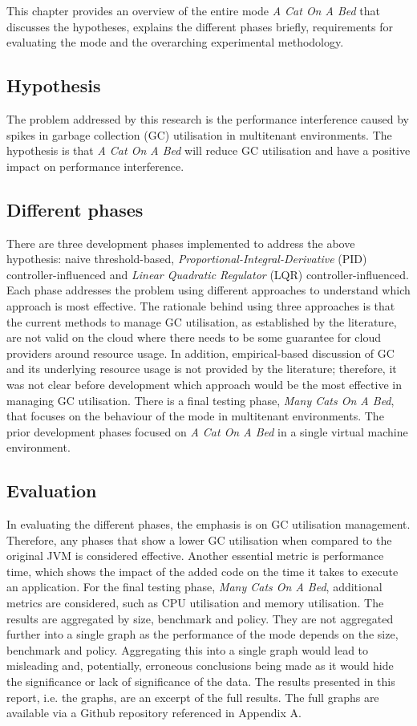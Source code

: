 This chapter provides an overview of the entire mode \emph{A Cat On A Bed} that discusses the hypotheses, explains the different
phases briefly, requirements for evaluating the mode and the overarching
experimental methodology.
\subsection{Hypothesis}
The problem addressed by this research is the performance interference
caused by spikes in garbage collection (GC) utilisation in multitenant environments. The
hypothesis is that \emph{A Cat On A Bed} will reduce GC utilisation and have a
positive impact on performance interference.
\subsection{Different phases}
There are three development phases implemented to address the above
hypothesis: naive threshold-based, \emph{Proportional-Integral-Derivative}
(PID) controller-influenced and \emph{Linear Quadratic Regulator} (LQR)
controller-influenced. Each phase addresses the problem using different
approaches to understand which approach is most effective. The rationale
behind using three approaches is that the current methods to manage GC
utilisation, as established by the literature, are not valid on the
cloud where there needs to be some guarantee for cloud providers around
resource usage. In addition, empirical-based discussion of GC and its
underlying resource usage is not provided by the literature; therefore,
it was not clear before development which approach would be the most
effective in managing GC utilisation.
\newline\newline
There is a final testing phase,\emph{ Many Cats On A Bed}, that focuses on the
behaviour of the mode in multitenant environments. The prior development
phases focused on \emph{A Cat On A Bed} in a single virtual machine
environment.
\subsection{Evaluation}
In evaluating the different phases, the emphasis is on GC utilisation
management. Therefore, any phases that show a lower GC utilisation when
compared to the original JVM is considered effective. Another essential
metric is performance time, which shows the impact of the added code on
the time it takes to execute an application. For the final testing
phase, \emph{Many Cats On A Bed}, additional metrics are considered, such as
CPU utilisation and memory utilisation. 
\newline\newline 
The results are aggregated by size, benchmark and policy. They are not aggregated further into a single graph as the performance of the mode depends on the size, benchmark and policy. Aggregating this into a single graph would lead to misleading and, potentially, erroneous conclusions being made as it would hide the significance or lack of significance of the data. The results presented in this report, i.e. the graphs, are an excerpt of the full results. The full graphs are available via a Github repository referenced in Appendix A. 
